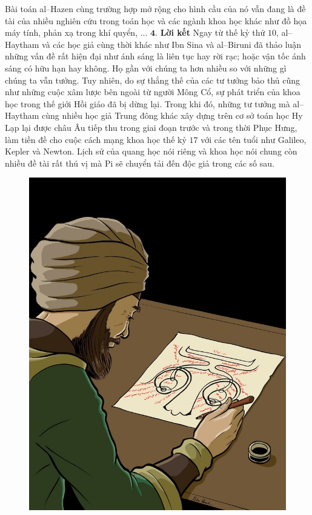 \begin{multicols}{2}
\begin{figure}[H]
		\vspace*{-10pt}
	\end{figure}
	Bài toán al--Hazen cùng trường hợp mở rộng cho hình cầu của nó vẫn đang là đề tài của nhiều nghiên cứu trong toán học và các ngành khoa học khác như đồ họa máy tính, phản xạ trong khí quyển, ...
	\vskip 0.1cm
	$\pmb{4.}$ \textbf{\color{lichsutoanhoc}Lời kết}
	\vskip 0.1cm
	Ngay từ thế kỷ thứ $10$, al--Haytham và các học giả cùng thời khác như Ibn Sina và al--Biruni đã thảo luận những vấn đề rất hiện đại như ánh sáng là liên tục hay rời rạc; hoặc vận tốc ánh sáng có hữu hạn hay không. Họ gần với chúng ta hơn nhiều so với những gì chúng ta vẫn tưởng. Tuy nhiên, do sự thắng thế của các tư tưởng bảo thủ cũng như những cuộc xâm lược bên ngoài từ người Mông Cổ, sự phát triển của khoa học trong thế giới Hồi giáo đã bị dừng lại. Trong khi đó, những tư tưởng mà al--Haytham cùng nhiều học giả Trung đông khác xây dựng trên cơ sở toán học Hy Lạp lại được châu Âu tiếp thu trong giai đoạn trước và trong thời Phục Hưng, làm tiền đề cho cuộc cách mạng khoa học thế kỷ $17$ với các tên tuổi như Galileo, Kepler và Newton. Lịch sử của quang học nói riêng và khoa học nói chung còn nhiều đề tài rất thú vị mà Pi sẽ chuyển tải đến độc giả trong các số sau.
	\begin{figure}[H]
		\vspace*{-5pt}
		\centering
		\captionsetup{labelformat= empty, justification=centering}
		\includegraphics[width= 0.85\linewidth]{11}

\end{figure}
\end{multicols}
